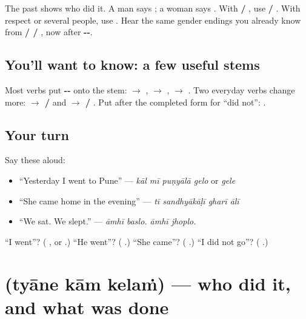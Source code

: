 The past shows who did it. A man says \textbf{ }; a woman says \textbf{ }. With \textbf{ / }, use \textbf{  /  }. With respect or several people, use \textbf{ }. Hear the same gender endings you already know from \textbf{ /  / }, now after \textbf{--}.

\subsection*{You'll want to know: a few useful stems}
Most verbs put \textbf{--} onto the stem: \textbf{ $\to$ }, \textbf{ $\to$ }, \textbf{ $\to$ }. Two everyday verbs change more: \textbf{ $\to$  / } and \textbf{ $\to$  / }. Put \textbf{} after the completed form for \textquotedblleft{}did not\textquotedblright{}: \textbf{  }.

\subsection*{Your turn}
Say these aloud:

\begin{itemize}
\raggedright
  \item \textquotedblleft{}Yesterday I went to Pune\textquotedblright{} — \emph{kāl mī puṇyālā gelo} or \emph{gele}
  \item \textquotedblleft{}She came home in the evening\textquotedblright{} — \emph{tī sandhyākāḷī gharī ālī}
  \item \textquotedblleft{}We sat. We slept.\textquotedblright{} — \emph{āmhī baslo. āmhī jhoplo.}
\end{itemize}

\begin{tcolorbox}[breakable,colback=teal!4,colframe=teal!35!black,title={Before you move on}]
\textquotedblleft{}I went\textquotedblright{}? (\textbf{ }, or \textbf{ }.) \textquotedblleft{}He went\textquotedblright{}? (\textbf{ }.) \textquotedblleft{}She came\textquotedblright{}? (\textbf{ }.) \textquotedblleft{}I did not go\textquotedblright{}? (\textbf{  }.)
\end{tcolorbox}
\section[\texorpdfstring{\mr{त्याने} \mr{काम} \mr{केलं} (tyāne kām kelaṁ)}{त्याने काम केलं (tyāne kām kelaṁ)}]{   (tyāne kām kelaṁ) — who did it, and what was done}

